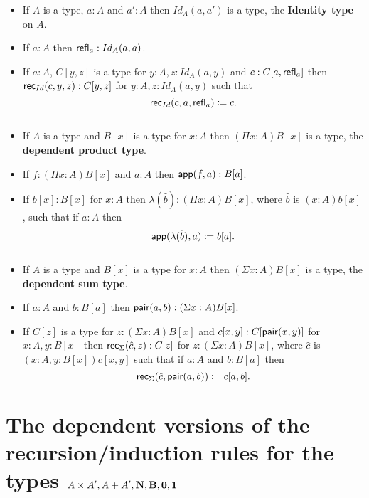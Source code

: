 {{\begin{description}
\item[The types $Id_A(a,a')$:] $\;$
\begin{itemize}
\item If $A$ is a type, $a:A$ and $a':A$ then $Id_A(a,a')$ is a type, the {\bf Identity type} on $A$.
\item If $a:A$ then $\mathsf{refl}_{a}:Id_A(a,a)$.
\item If $a:A$, $C[y,z]$ is a type for $y:A, z:Id_A(a,y)$ and $c:C[a,\mathsf{refl}_{a}]$ then ${\sf rec}_{Id}(c,y,z):C[y,z]$ for $y:A,z:Id_A(a,y)$ such that
  \[ {\sf rec}_{Id}(c,a,\mathsf{refl}_{a})\coloneqq c.\]
\end{itemize}
\newcommand{\bbb}{{]}}
\item[The types $(\Pi x:A)$ $\!\! B[x\bbb$:] $\;$
\begin{itemize}
\item If $A$ is a type and $B[x]$ is a type for $x:A$ then $(\Pi x:A)B[x]$ is a type, the {\bf dependent product type}.
\item If $f:(\Pi x:A)B[x]$ and $a:A$ then ${\sf app}(f,a):B[a]$.
\item If $b[x]:B[x]$ for $x:A$ then $\lambda(\hat{b}):(\Pi x:A)B[x]$, 
where $\hat{b}$ is $(x:A)b[x]$, such that if $a:A$ then 
  \[ {\sf app}(\lambda(\hat{b}),a)\coloneqq b[a].\]
\end{itemize}
\item\item[The types $(\Sigma x:A)$ $\!\! B[x\bbb$:] $\;$ 
\begin{itemize}
\item If $A$ is a type and $B[x]$ is a type for $x:A$ then $(\Sigma x:A)B[x]$ is a type, the {\bf dependent sum type}.
\item If $a:A$ and $b:B[a]$ then ${\sf pair}(a,b):(\Sigma x:A)B[x]$.
\item If $C[z]$ is a type for $z:(\Sigma x:A)B[x]$ and $c[x,y]:C[{\sf pair}(x,y)]$ for $x:A,y:B[x]$ then ${\sf rec}_\Sigma(\hat{c},z):C[z]$ for $z:(\Sigma x:A)B[x]$, where $\hat{c}$ is $(x:A,y:B[x])c[x,y]$ such that if $a:A$ and $b:B[a]$ then
  \[ {\sf rec}_\Sigma(\hat{c},{\sf pair}(a,b))\coloneqq c[a,b].\] 

\end{itemize}

\end{description}

\section{The dependent versions of the recursion/induction rules for the types $A\times A', A+A',{\bf N}, {\bf B}, {\bf 0},{\bf 1}$}

}}
